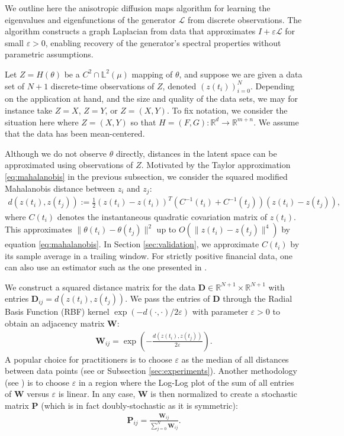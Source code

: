 \documentclass[11pt]{article}
\theoremstyle{plain}
\theoremstyle{definition}
\theoremstyle{remark}
\numberwithin{equation}{section}
\newcommand{\R}{\mathbb{R}}
\renewcommand{\L}{\mathscr{L}}
\newcommand{\lb}{\left}
\newcommand{\rb}{\right}
\newcommand{\veps}{\varepsilon}
\newcommand{\bL}{\mathbb{L}}
\begin{document}
We outline here the anisotropic diffusion maps algorithm for learning the eigenvalues and eigenfunctions of the generator $\L$ from discrete observations. The algorithm constructs a graph Laplacian from data that approximates $I+\veps \L$ for small $\veps > 0$, enabling recovery of the generator's spectral properties without parametric assumptions.

Let $Z=H(\theta)$ be a $C^2\cap \bL^2(\mu)$ mapping of $\theta$, and suppose we are given a data set of $N+1$ discrete-time observations of $Z$, denoted $(z(t_i))_{i=0}^N$.
Depending on the application at hand, and the size and quality of the data sets, we may for instance take $Z=X$, $Z=Y$, or $Z=(X,Y)$. To fix notation, we consider the situation here where $Z=(X,Y)$ so that $H=(F,G):\R^{d}\to\R^{m+n}$. We assume that the data has been mean-centered.

Although we do not observe $\theta$ directly, distances in the latent space can be approximated using observations of $Z$. Motivated by the Taylor approximation \eqref{eq:mahalanobis} in the previous subsection, we consider the squared modified Mahalanobis distance between $z_i$ and $z_j$:
\begin{align*}
d(z(t_i),z(t_j)):=\frac{1}{2}(z(t_i)-z(t_i))^T(C^{-1}(t_i)+C^{-1}(t_j))(z(t_i)-z(t_j)),
\end{align*}
where $C(t_i)$ denotes the instantaneous quadratic covariation matrix of $z(t_i)$. This approximates $\|\theta(t_i)-\theta(t_j)\|^2$ up to $O(\|z(t_i)-z(t_j)\|^4)$ by equation \eqref{eq:mahalanobis}. In Section \ref{sec:validation}, we approximate $C(t_i)$ by its sample average in a trailing window. For strictly positive financial data, one can also use an estimator such as the one presented in \citet{chesney_estimating_1995}.

We construct a squared distance matrix for the data $\mathbf{D} \in \R^{N+1}\times\R^{N+1}$ with entries \newline ${\mathbf{D}_{ij}=d(z(t_i),z(t_j))}$. We pass the entries of $\mathbf{D}$ through the Radial Basis Function (RBF) kernel $\exp\lb(-d(\cdot,\cdot)/2 \veps\rb)$ with parameter $\veps>0$ to obtain an adjacency matrix $\mathbf{W}$:
\begin{align*}
\mathbf{W}_{ij}=
\exp\lb(-\frac{d(z(t_i),z(t_j))}{2 \veps}\rb).
\end{align*}
A popular choice for practitioners is to choose $\veps$ as the median of all distances between data points (see \citet{shnitzer2020diffusion} or Subsection \ref{sec:experiments}). Another methodology (see \citet[Figure 3]{singer_detecting_2009}) is to choose $\veps$ in a region where the Log-Log plot of the sum of all entries of $\mathbf{W}$ versus $\veps$ is linear.
In any case, $\mathbf{W}$ is then normalized to create a stochastic matrix $\mathbf{P}$ (which is in fact doubly-stochastic as it is symmetric):
\begin{align*}
\mathbf{P}_{ij}=\frac{\mathbf{W}_{ij}}{\sum_{j=0}^{N} \mathbf{W}_{ij}}.
\end{align*}
\end{document}
